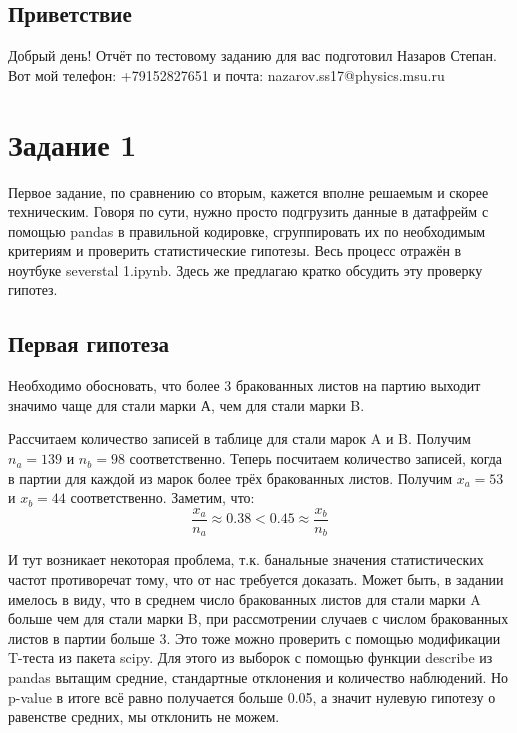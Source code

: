 \documentclass[12pt,a4paper]{report}
\begin{document}
\section*{Приветствие}
Добрый день! Отчёт по тестовому заданию для вас подготовил Назаров Степан. Вот мой телефон: +79152827651 и почта: nazarov.ss17@physics.msu.ru
\setlength{\parindent}{1.25cm} 
\sloppy   

\onehalfspacing
\thispagestyle{empty}


\setcounter{page}{1}
\tableofcontents

\chapter*{Задание 1}

Первое задание, по сравнению со вторым, кажется вполне решаемым и скорее техническим. Говоря по сути, нужно просто подгрузить данные в датафрейм с помощью pandas в правильной кодировке, сгруппировать их по необходимым критериям и проверить статистические гипотезы. Весь процесс отражён в ноутбуке severstal 1.ipynb. Здесь же предлагаю кратко обсудить эту проверку гипотез.
\section*{Первая гипотеза}
Необходимо обосновать, что более 3 бракованных листов на партию выходит значимо чаще для стали марки А, чем для стали марки B.

Рассчитаем количество записей в таблице для стали марок A и B. Получим $n_a = 139$ и $n_b = 98$ соответственно. Теперь посчитаем количество записей, когда в партии для каждой из марок более трёх бракованных листов. Получим $x_a = 53$ и $x_b = 44$ соответственно. Заметим, что:
\begin{equation}
\frac{x_a}{n_a} \approx 0.38 < 0.45 \approx \frac{x_b}{n_b}
\end{equation}

И тут возникает некоторая проблема, т.к. банальные значения статистических частот противоречат тому, что от нас требуется доказать. Может быть, в задании имелось в виду, что в среднем число бракованных листов для стали марки A больше чем для стали марки B, при рассмотрении случаев с числом бракованных листов в партии больше 3. Это тоже можно проверить с помощью модификации T-теста из пакета scipy. Для этого из выборок с помощью функции describe из pandas вытащим средние, стандартные отклонения и количество наблюдений. Но p-value в итоге всё равно получается больше 0.05, а значит нулевую гипотезу о равенстве средних, мы отклонить не можем.
\end{document}
